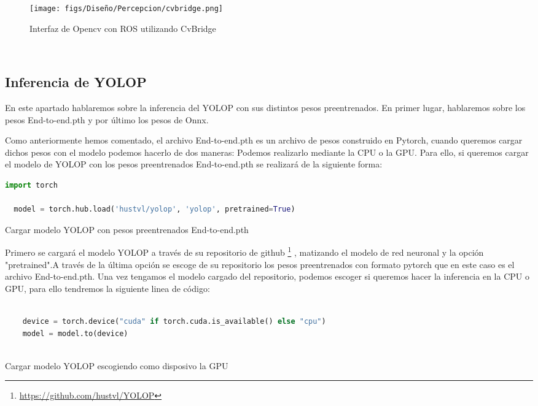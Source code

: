 \begin{figure} [H]
  \begin{center}
    \texttt{[image: figs/Diseño/Percepcion/cvbridge.png]}
  \end{center}
  \caption{Interfaz de Opencv con ROS utilizando CvBridge}
  \label{fig:CvBridge}
\end{figure}\

\newpage
\subsection{Inferencia de YOLOP}
\label{sec:Inferencia de YOLOP}

En este apartado hablaremos sobre la inferencia del YOLOP con sus distintos pesos preentrenados. En primer lugar, hablaremos
sobre los pesos End-to-end.pth y por último los pesos de Onnx.

Como anteriormente hemos comentado, el archivo End-to-end.pth es un archivo de pesos construido en Pytorch, cuando queremos cargar
dichos pesos con el modelo podemos hacerlo de dos maneras: Podemos realizarlo mediante la CPU o la GPU. 
Para ello, si queremos cargar el modelo de YOLOP con los pesos preentrenados End-to-end.pth se realizará de la siguiente forma:
\begin{code}[h]
  \begin{lstlisting}[language=Python]
  import torch
  
  model = torch.hub.load('hustvl/yolop', 'yolop', pretrained=True)

  \end{lstlisting}
  \caption[Cargar modelo YOLOP con pesos preentrenados End-to-end.pth]{Cargar modelo YOLOP con pesos preentrenados End-to-end.pth}
  \label{cod:codejemplo}
  \end{code}  

  Primero se cargará el modelo YOLOP a través de su repositorio de github \footnote{\url{https://github.com/hustvl/YOLOP}}
  , matizando el modelo de red neuronal y la opción "pretrained".A través de la última opción se escoge de su repositorio los pesos preentrenados con formato pytorch que
  en este caso es el archivo End-to-end.pth. Una vez tengamos el modelo cargado del repositorio, podemos escoger si queremos 
  hacer la inferencia en la CPU o GPU, para ello tendremos la siguiente linea de código: 

  
  \begin{code}[h]
    \begin{lstlisting}[language=Python]
   
    device = torch.device("cuda" if torch.cuda.is_available() else "cpu")
    model = model.to(device)
  
    \end{lstlisting}
    \caption[Cargar modelo YOLOP escogiendo como disposivo la GPU]{Cargar modelo YOLOP escogiendo como disposivo la GPU}
    \label{cod:codeloadYOLOP}
    \end{code}  

